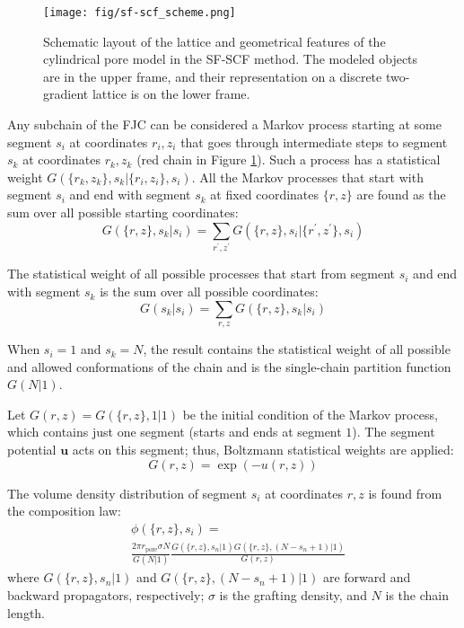 \documentclass[10pt, a4paper]{article}
\begin{document}
\begin{multicols}{2}
\begin{figure}[H]
    \centering
    \texttt{[image: fig/sf-scf\_scheme.png]}
    \caption{
    Schematic layout of the lattice and geometrical features of the cylindrical pore model in the SF-SCF method.
    The modeled objects are in the upper frame, and their representation on a discrete two-gradient lattice is on the lower frame.
    }
\label{fig:sf-scf_scheme}
\end{figure}

Any subchain of the FJC can be considered a Markov process starting at some segment $s_i$ at coordinates $r_i, z_i$ that goes through intermediate steps to segment $s_k$ at coordinates $r_k, z_k$ (red chain in Figure \ref{fig:sf-scf_scheme}).
Such a process has a statistical weight $G(\{r_k, z_k\}, s_k | \{r_i, z_i\}, s_i)$.
All the Markov processes that start with segment $s_i$ and end with segment $s_k$ at fixed coordinates $\{r, z\}$ are found as the sum over all possible starting coordinates:
\begin{equation}
    \label{eq:sum_to_phi}
    G(\{r, z\}, s_k | s_i) = \sum_{r^{\prime}, z^{\prime}} G(\{r, z\}, s_i | \{r^{\prime}, z^{\prime}\}, s_i)
\end{equation}


The statistical weight of all possible processes that start from segment $s_i$ and end with segment $s_k$ is the sum over all possible coordinates:
\begin{equation}
    G(s_k | s_i) = \sum_{r, z} G(\{r, z\}, s_k | s_i)
\end{equation}

When $s_i=1$ and $s_k=N$, the result contains the statistical weight of all possible and allowed conformations of the chain and is the single-chain partition function $G(N|1)$.

Let $G(r, z) = G(\{r, z\}, 1|1)$ be the initial condition of the Markov process, which contains just one segment (starts and ends at segment $1$).
The segment potential $\mathbf{u}$ acts on this segment; thus, Boltzmann statistical weights are applied:
\begin{equation}
    G(r, z) = \exp(-u(r,z))
\end{equation}

The volume density distribution of segment $s_i$ at coordinates $r, z$ is found from the composition law:
\begin{equation}
    \label{eq:propagation}
    \begin{aligned}
        &\phi(\{r, z\}, s_i) = \\
        &\frac{2 \pi r_{\textrm{pore}} \sigma N}{G(N|1)}
        \frac{G(\{r, z\}, s_n | 1) G(\{r, z\}, (N - s_n + 1) | 1)}{G(r, z)}
    \end{aligned}
\end{equation}
where $G(\{r, z\}, s_n | 1)$ and $G(\{r, z\}, (N - s_n + 1) | 1)$ are forward and backward propagators, respectively; $\sigma$ is the grafting density, and $N$ is the chain length.


\end{multicols}
\end{document}
